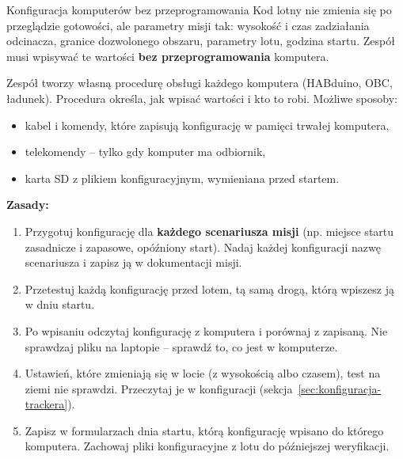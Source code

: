\begin{sekcja}{Konfiguracja komputerów bez przeprogramowania}\label{sec:konfiguracja}
Kod lotny nie zmienia się po przeglądzie gotowości, ale parametry misji tak: wysokość i czas zadziałania odcinacza, granice dozwolonego obszaru, parametry lotu, godzina startu. Zespół musi wpisywać te wartości \textbf{bez przeprogramowania} komputera.

Zespół tworzy własną procedurę obsługi każdego komputera (HABduino, OBC, ładunek). Procedura określa, jak wpisać wartości i kto to robi. Możliwe sposoby:
\begin{itemize}
  \item kabel i komendy, które zapisują konfigurację w pamięci trwałej komputera,
  \item telekomendy -- tylko gdy komputer ma odbiornik,
  \item karta SD z plikiem konfiguracyjnym, wymieniana przed startem.
\end{itemize}

\textbf{Zasady:}
\begin{enumerate}
  \item Przygotuj konfigurację dla \textbf{każdego scenariusza misji} (np. miejsce startu zasadnicze i zapasowe, opóźniony start). Nadaj każdej konfiguracji nazwę scenariusza i zapisz ją w dokumentacji misji.
  \item Przetestuj każdą konfigurację przed lotem, tą samą drogą, którą wpiszesz ją w dniu startu.
  \item Po wpisaniu odczytaj konfigurację z komputera i porównaj z zapisaną. Nie sprawdzaj pliku na laptopie -- sprawdź to, co jest w komputerze.
  \item Ustawień, które zmieniają się w locie (z wysokością albo czasem), test na ziemi nie sprawdzi. Przeczytaj je w konfiguracji (sekcja~\ref{sec:konfiguracja-trackera}).
  \item Zapisz w formularzach dnia startu, którą konfigurację wpisano do którego komputera. Zachowaj pliki konfiguracyjne z lotu do późniejszej weryfikacji.
\end{enumerate}
\end{sekcja}
